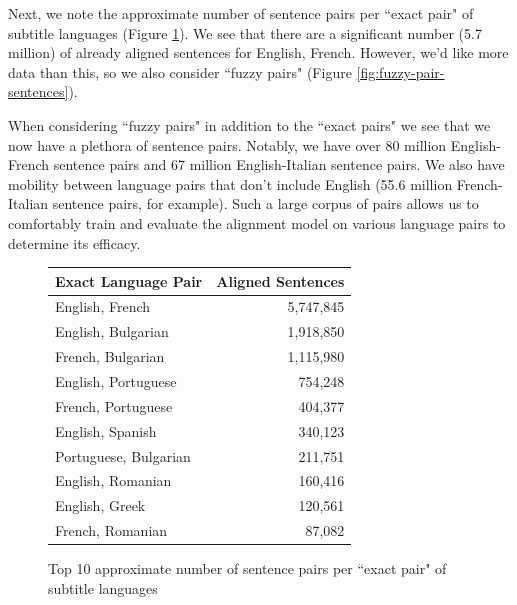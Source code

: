 \documentclass[twoside,twocolumn]{article}
\begin{document}
Next, we note the approximate number of sentence pairs per ``exact pair" of
subtitle languages (Figure \ref{fig:exact-pair-sentences}). We see that there
are a significant number (5.7 million) of already aligned sentences for
English, French. However, we'd like more data than this, so we also consider
``fuzzy pairs" (Figure \ref{fig:fuzzy-pair-sentences}).

When considering ``fuzzy pairs" in addition to the ``exact pairs" we see that
we now have a plethora of sentence pairs. Notably, we have over 80 million
English-French sentence pairs and 67 million English-Italian sentence pairs.
We also have mobility between language pairs that don't include English
(55.6 million French-Italian sentence pairs, for example). Such a large corpus
of pairs allows us to comfortably train and evaluate the alignment model on
various language pairs to determine its efficacy.

\begin{figure}[ht]
    \centering
    \begin{tabular}{ |l|r| }
        \hline
        \multicolumn{1}{|c|}{\textbf{Exact Language Pair}} &
            \multicolumn{1}{|c|}{\textbf{Aligned Sentences}} \\ \hline
        English, French       & 5,747,845 \\ \hline
        English, Bulgarian    & 1,918,850 \\ \hline
        French, Bulgarian     & 1,115,980 \\ \hline
        English, Portuguese   & 754,248   \\ \hline
        French, Portuguese    & 404,377   \\ \hline
        English, Spanish      & 340,123   \\ \hline
        Portuguese, Bulgarian & 211,751   \\ \hline
        English, Romanian     & 160,416   \\ \hline
        English, Greek        & 120,561   \\ \hline
        French, Romanian      & 87,082    \\ \hline
    \end{tabular}

    \caption{Top 10 approximate number of sentence pairs per ``exact pair" of
             subtitle languages}
    \label{fig:exact-pair-sentences}
\end{figure}
\end{document}
